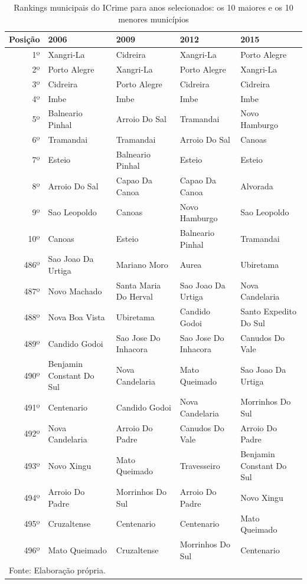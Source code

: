 \documentclass[12pt,openright,oneside,a4paper,english,french,spanish]{abntex2}
\numberwithin{table}{section} %
\numberwithin{figure}{section} %
\begin{document}
\begin{table}[H]
\caption{Rankings municipais do ICrime para anos selecionados: os 10 maiores e os 10 menores municípios}
\label{tab:rank_ICrime}
\begin{tiny}
\centering
\begin{tabular}{rllll}
  \hline
Posição & 2006 & 2009 & 2012 & 2015 \\ 
  \hline
1º & Xangri-La & Cidreira & Xangri-La & Porto Alegre \\ 
2º & Porto Alegre & Xangri-La & Porto Alegre & Xangri-La \\ 
3º & Cidreira & Porto Alegre & Cidreira & Cidreira \\ 
4º & Imbe & Imbe & Imbe & Imbe \\ 
5º & Balneario Pinhal & Arroio Do Sal & Tramandai & Novo Hamburgo \\ 
6º & Tramandai & Tramandai & Arroio Do Sal & Canoas \\ 
7º & Esteio & Balneario Pinhal & Esteio & Esteio \\ 
8º & Arroio Do Sal & Capao Da Canoa & Capao Da Canoa & Alvorada \\ 
9º & Sao Leopoldo & Canoas & Novo Hamburgo & Sao Leopoldo \\ 
10º & Canoas & Esteio & Balneario Pinhal & Tramandai \\ 
486º & Sao Joao Da Urtiga & Mariano Moro & Aurea & Ubiretama \\ 
487º & Novo Machado & Santa Maria Do Herval & Sao Joao Da Urtiga & Nova Candelaria \\ 
488º & Nova Boa Vista & Ubiretama & Candido Godoi & Santo Expedito Do Sul \\ 
489º & Candido Godoi & Sao Jose Do Inhacora & Sao Jose Do Inhacora & Canudos Do Vale \\ 
490º & Benjamin Constant Do Sul & Nova Candelaria & Mato Queimado & Sao Joao Da Urtiga \\ 
491º & Centenario & Candido Godoi & Nova Candelaria & Morrinhos Do Sul \\ 
492º & Nova Candelaria & Arroio Do Padre & Canudos Do Vale & Arroio Do Padre \\ 
493º & Novo Xingu & Mato Queimado & Travesseiro & Benjamin Constant Do Sul \\ 
494º & Arroio Do Padre & Morrinhos Do Sul & Arroio Do Padre & Novo Xingu \\ 
495º & Cruzaltense & Centenario & Centenario & Mato Queimado \\ 
496º & Mato Queimado & Cruzaltense & Morrinhos Do Sul & Centenario \\ 
   \hline
\multicolumn{5}{l}{Fonte: Elaboração própria.}
\end{tabular}
\end{tiny}
\end{table}
\end{document}
